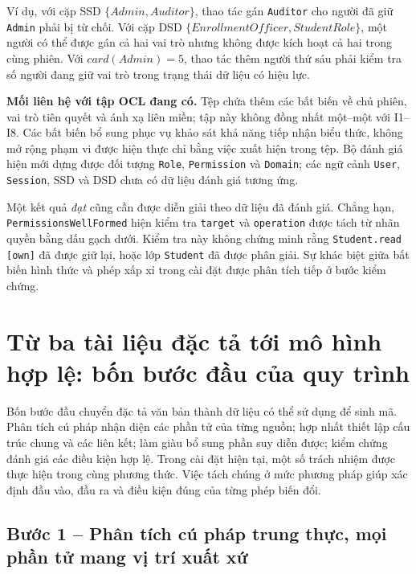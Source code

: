 Ví dụ, với cặp SSD $\{\mathit{Admin},\mathit{Auditor}\}$, thao tác gán \texttt{Auditor} cho người đã giữ \texttt{Admin} phải bị từ chối. Với cặp DSD $\{\mathit{EnrollmentOfficer},\mathit{StudentRole}\}$, một người có thể được gán cả hai vai trò nhưng không được kích hoạt cả hai trong cùng phiên. Với $\mathit{card}(\mathit{Admin})=5$, thao tác thêm người thứ sáu phải kiểm tra số người đang giữ vai trò trong trạng thái dữ liệu có hiệu lực.

\textbf{Mối liên hệ với tập OCL đang có.} Tệp  chứa thêm các bất biến về chủ phiên, vai trò tiên quyết và ánh xạ liên miền; tập này không đồng nhất một--một với I1--I8. Các bất biến bổ sung phục vụ khảo sát khả năng tiếp nhận biểu thức, không mở rộng phạm vi được hiện thực chỉ bằng việc xuất hiện trong tệp. Bộ đánh giá hiện mới dựng được đối tượng \texttt{Role}, \texttt{Permission} và \texttt{Domain}; các ngữ cảnh \texttt{User}, \texttt{Session}, SSD và DSD chưa có dữ liệu đánh giá tương ứng.

Một kết quả \emph{đạt} cũng cần được diễn giải theo dữ liệu đã đánh giá. Chẳng hạn, \texttt{PermissionsWellFormed} hiện kiểm tra \texttt{target} và \texttt{operation} được tách từ nhãn quyền bằng dấu gạch dưới. Kiểm tra này không chứng minh rằng \texttt{Student.read [own]} đã được giữ lại, hoặc lớp \texttt{Student} đã được phân giải. Sự khác biệt giữa bất biến hình thức và phép xấp xỉ trong cài đặt được phân tích tiếp ở bước kiểm chứng.

\section{Từ ba tài liệu đặc tả tới mô hình hợp lệ: bốn bước đầu của quy trình}
\label{sec:bon-buoc-dau}

Bốn bước đầu chuyển đặc tả văn bản thành dữ liệu có thể sử dụng để sinh mã. Phân tích cú pháp nhận diện các phần tử của từng nguồn; hợp nhất thiết lập cấu trúc chung và các liên kết; làm giàu bổ sung phần suy diễn được; kiểm chứng đánh giá các điều kiện hợp lệ. Trong cài đặt hiện tại, một số trách nhiệm được thực hiện trong cùng phương thức. Việc tách chúng ở mức phương pháp giúp xác định đầu vào, đầu ra và điều kiện đúng của từng phép biến đổi.

\subsection{Bước 1 -- Phân tích cú pháp trung thực, mọi phần tử mang vị trí xuất xứ}
\label{sec:buoc1}


